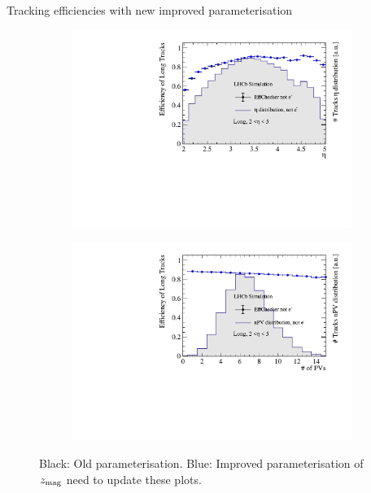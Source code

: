 \documentclass[xcolor={dvipsnames}]{beamer}
\begin{document}
\begin{frame}{Tracking efficiencies with new improved parameterisation}
\begin{figure}[htb]
\begin{subfigure}{0.45\textwidth}
      \includegraphics[width=1\textwidth]{Plots/TrackEfficiency_eta_improved_MC_parameterisation.pdf}
    \end{subfigure}%
    \begin{subfigure}{0.45\textwidth}
      \includegraphics[width=1\textwidth]{Plots/TrackEfficiency_nPV_improved_MC_parameterisation.pdf}
    \end{subfigure}
    \vspace{-0.2cm}
    \caption*{Black: Old parameterisation. {\color{blue}Blue: Improved parameterisation of $z_{\rm mag}$} {\color{red}need to update these plots}.}
  \end{figure}
\end{frame}
\end{document}
